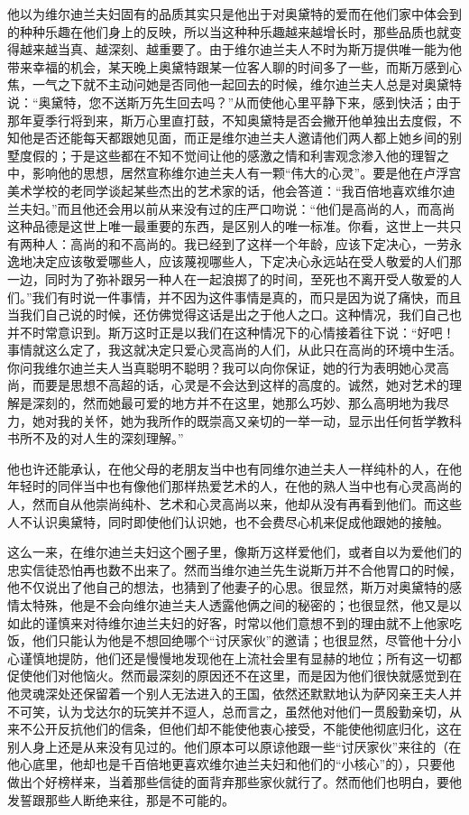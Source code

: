\par 他以为维尔迪兰夫妇固有的品质其实只是他出于对奥黛特的爱而在他们家中体会到的种种乐趣在他们身上的反映，所以当这种种乐趣越来越增长时，那些品质也就变得越来越当真、越深刻、越重要了。由于维尔迪兰夫人不时为斯万提供唯一能为他带来幸福的机会，某天晚上奥黛特跟某一位客人聊的时间多了一些，而斯万感到心焦，一气之下就不主动问她是否同他一起回去的时候，维尔迪兰夫人总是对奥黛特说：“奥黛特，您不送斯万先生回去吗？”从而使他心里平静下来，感到快活；由于那年夏季行将到来，斯万心里直打鼓，不知奥黛特是否会撇开他单独出去度假，不知他是否还能每天都跟她见面，而正是维尔迪兰夫人邀请他们两人都上她乡间的别墅度假的；于是这些都在不知不觉间让他的感激之情和利害观念渗入他的理智之中，影响他的思想，居然宣称维尔迪兰夫人有一颗“伟大的心灵”。要是他在卢浮宫美术学校的老同学谈起某些杰出的艺术家的话，他会答道：“我百倍地喜欢维尔迪兰夫妇。”而且他还会用以前从来没有过的庄严口吻说：“他们是高尚的人，而高尚这种品德是这世上唯一最重要的东西，是区别人的唯一标准。你看，这世上一共只有两种人：高尚的和不高尚的。我已经到了这样一个年龄，应该下定决心，一劳永逸地决定应该敬爱哪些人，应该蔑视哪些人，下定决心永远站在受人敬爱的人们那一边，同时为了弥补跟另一种人在一起浪掷了的时间，至死也不离开受人敬爱的人们。”我们有时说一件事情，并不因为这件事情是真的，而只是因为说了痛快，而且当我们自己说的时候，还仿佛觉得这话是出之于他人之口。这种情况，我们自己也并不时常意识到。斯万这时正是以我们在这种情况下的心情接着往下说：“好吧！事情就这么定了，我这就决定只爱心灵高尚的人们，从此只在高尚的环境中生活。你问我维尔迪兰夫人当真聪明不聪明？我可以向你保证，她的行为表明她心灵高尚，而要是思想不高超的话，心灵是不会达到这样的高度的。诚然，她对艺术的理解是深刻的，然而她最可爱的地方并不在这里，她那么巧妙、那么高明地为我尽力，她对我的关怀，她为我所作的既崇高又亲切的一举一动，显示出任何哲学教科书所不及的对人生的深刻理解。”
\par 他也许还能承认，在他父母的老朋友当中也有同维尔迪兰夫人一样纯朴的人，在他年轻时的同伴当中也有像他们那样热爱艺术的人，在他的熟人当中也有心灵高尚的人，然而自从他崇尚纯朴、艺术和心灵高尚以来，他却从没有再看到他们。而这些人不认识奥黛特，同时即使他们认识她，也不会费尽心机来促成他跟她的接触。
\par 这么一来，在维尔迪兰夫妇这个圈子里，像斯万这样爱他们，或者自以为爱他们的忠实信徒恐怕再也数不出来了。然而当维尔迪兰先生说斯万并不合他胃口的时候，他不仅说出了他自己的想法，也猜到了他妻子的心思。很显然，斯万对奥黛特的感情太特殊，他是不会向维尔迪兰夫人透露他俩之间的秘密的；也很显然，他又是以如此的谨慎来对待维尔迪兰夫妇的好客，时常以他们意想不到的理由就不上他家吃饭，他们只能认为他是不想回绝哪个“讨厌家伙”的邀请；也很显然，尽管他十分小心谨慎地提防，他们还是慢慢地发现他在上流社会里有显赫的地位；所有这一切都促使他们对他恼火。然而最深刻的原因还不在这里，而是因为他们很快就感觉到在他灵魂深处还保留着一个别人无法进入的王国，依然还默默地认为萨冈亲王夫人并不可笑，认为戈达尔的玩笑并不逗人，总而言之，虽然他对他们一贯殷勤亲切，从来不公开反抗他们的信条，但他们却不能使他衷心接受，不能使他彻底归化，这在别人身上还是从来没有见过的。他们原本可以原谅他跟一些“讨厌家伙”来往的（在他心底里，他却也是千百倍地更喜欢维尔迪兰夫妇和他们的“小核心”的），只要他做出个好榜样来，当着那些信徒的面背弃那些家伙就行了。然而他们也明白，要他发誓跟那些人断绝来往，那是不可能的。
